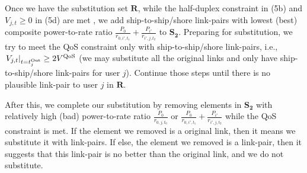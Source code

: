 \documentclass[conference]{IEEEtran}
\begin{document}
 Once we have the substitution set $\mathbf{R}$, while the half-duplex constraint in (5b) and ${V_{j,t}} \ge 0$ in (5d) are met%
 , we add ship-to-ship/shore link-pairs with lowest (best) composite power-to-rate ratio $ {\frac{{{P_0}}}{{{r_{0,i',{t_1}}}}} + \frac{{{P_{i'}}}}{{{r_{i',j,{t_2}}}}}} $ to ${{\mathbf{S}}_{\mathbf{2}}}$. Preparing for substitution, we try to meet the QoS constraint only with ship-to-ship/shore link-pairs, i.e., ${\left. {{V_{j,t}}} \right|_{t = t_j^{{\rm{Out}}}}} \ge 2{V^{\rm{QoS}}}$ (we may substitute all the original links and only have ship-to-ship/shore link-pairs for user $j$). 
 Continue those steps until there is no plausible link-pair to user $j$ in $\mathbf{R}$. %

 After this, we complete our substitution by removing elements in ${{\mathbf{S}}_{\mathbf{2}}}$ with relatively high (bad) power-to-rate ratio ${\frac{P_0}{r_{0,j,{t_0}}}}$ or $ {\frac{{{P_0}}}{{{r_{0,i',{t_1}}}}} + \frac{{{P_{i'}}}}{{{r_{i',j,{t_2}}}}}} $ while the QoS constraint is met. If the element we removed is a original link, then it means we substitute it with link-pairs. If else, the element we removed is a link-pair, then it suggests that this link-pair is no better than the original link, and we do not substitute. 
\end{document}
